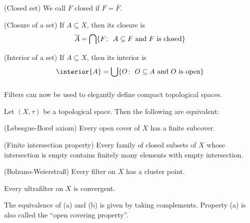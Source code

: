 \documentclass[%
	,english 
	,headings	= small 
	,leqno
	,parskip		= half+
	,DIV			= 14
	,BCOR 			= 10mm	
		]{scrartcl}
\begin{document}
\begin{multicols}{2}
\begin{myenumerate}
	\item (Closed set) 
	We call $ F $ closed if $ F = \overline{F} $.
	
	\item (Closure of a set)
	If $ A \subseteq X $, then its closure is 
	\[
    	\overline{ A } = \bigcap \{ F \colon \text{ $ A \subseteq F $ and $ F $ is closed} \}
	\]
	\item (Interior of a set)
	If $ A \subseteq X $, then its interior is
	\[ 
    	\interior{ A } = \bigcup \{ O \colon \text{ $ O \subseteq A $ and $ O $ is open} \}
	\]

\end{myenumerate}
%	
%	
%	
%	
%	

\subsubsection{}
Filters can now be used to elegantly define compact topological spaces.
%
\begin{proposition}
Let $ ( X , \tau ) $ be a topological space.
Then the following are equivalent:
%
\begin{myequivalent}
	\item (Lebesgue-Borel axiom)
	Every open cover of $ X $ has a finite subcover.
	
	\item (Finite intersection property)
	Every family of closed subsets of $ X $ whose intersection is empty contains finitely many elements with empty intersection.	
	
	\item (Bolzano-Weierstraß)
	Every filter on $ X $ has a cluster point.
	
	\item
	Every ultrafilter on $ X $ is convergent.
	
\end{myequivalent}
\end{proposition}
%
The equivalence of (a) and (b) is given by taking complements.
Property (a) is also called the \enquote{open covering property}.


\end{multicols}
\end{document}
